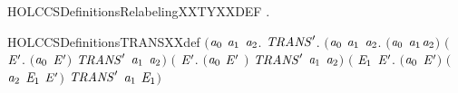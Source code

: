 \newcommand{\HOLCCSDefinitionsRelabelingXXISOXXDEF}{\UseVerbatim{HOLCCSDefinitionsRelabelingXXISOXXDEF}}
\begin{SaveVerbatim}{HOLCCSDefinitionsRelabelingXXTYXXDEF}
\HOLTokenTurnstile{} \HOLSymConst{\HOLTokenExists{}}.   
\end{SaveVerbatim}
\newcommand{\HOLCCSDefinitionsRelabelingXXTYXXDEF}{\UseVerbatim{HOLCCSDefinitionsRelabelingXXTYXXDEF}}
\begin{SaveVerbatim}{HOLCCSDefinitionsTRANSXXdef}
\HOLTokenTurnstile{}  \HOLSymConst{\ensuremath{=}}
   \ensuremath{(}\HOLTokenLambda{}\ensuremath{\HOLBoundVar{a}\sb{\mathrm{0}}} \ensuremath{\HOLBoundVar{a}\sb{\mathrm{1}}} \ensuremath{\HOLBoundVar{a}\sb{\mathrm{2}}}.
        \HOLSymConst{\HOLTokenForall{}}\ensuremath{\HOLBoundVar{TRANS}\sp{\prime{}}}.
          \ensuremath{(}\HOLSymConst{\HOLTokenForall{}}\ensuremath{\HOLBoundVar{a}\sb{\mathrm{0}}} \ensuremath{\HOLBoundVar{a}\sb{\mathrm{1}}} \ensuremath{\HOLBoundVar{a}\sb{\mathrm{2}}}.
             \ensuremath{(}\ensuremath{\HOLBoundVar{a}\sb{\mathrm{0}}} \HOLSymConst{\ensuremath{=}} \ensuremath{\HOLBoundVar{a}\sb{\mathrm{1}}}\HOLSymConst{\ensuremath{\ldotp}}\ensuremath{\HOLBoundVar{a}\sb{\mathrm{2}}}\ensuremath{)} \HOLSymConst{\HOLTokenDisj{}}
             \ensuremath{(}\HOLSymConst{\HOLTokenExists{}} \ensuremath{\HOLBoundVar{E}\sp{\prime{}}}. \ensuremath{(}\ensuremath{\HOLBoundVar{a}\sb{\mathrm{0}}} \HOLSymConst{\ensuremath{=}}  \HOLSymConst{\ensuremath{+}} \ensuremath{\HOLBoundVar{E}\sp{\prime{}}}\ensuremath{)} \HOLSymConst{\HOLTokenConj{}} \ensuremath{\HOLBoundVar{TRANS}\sp{\prime{}}}  \ensuremath{\HOLBoundVar{a}\sb{\mathrm{1}}} \ensuremath{\HOLBoundVar{a}\sb{\mathrm{2}}}\ensuremath{)} \HOLSymConst{\HOLTokenDisj{}}
             \ensuremath{(}\HOLSymConst{\HOLTokenExists{}} \ensuremath{\HOLBoundVar{E}\sp{\prime{}}}. \ensuremath{(}\ensuremath{\HOLBoundVar{a}\sb{\mathrm{0}}} \HOLSymConst{\ensuremath{=}} \ensuremath{\HOLBoundVar{E}\sp{\prime{}}} \HOLSymConst{\ensuremath{+}} \ensuremath{)} \HOLSymConst{\HOLTokenConj{}} \ensuremath{\HOLBoundVar{TRANS}\sp{\prime{}}}  \ensuremath{\HOLBoundVar{a}\sb{\mathrm{1}}} \ensuremath{\HOLBoundVar{a}\sb{\mathrm{2}}}\ensuremath{)} \HOLSymConst{\HOLTokenDisj{}}
             \ensuremath{(}\HOLSymConst{\HOLTokenExists{}} \ensuremath{\HOLBoundVar{E}\sb{\mathrm{1}}} \ensuremath{\HOLBoundVar{E}\sp{\prime{}}}.
                \ensuremath{(}\ensuremath{\HOLBoundVar{a}\sb{\mathrm{0}}} \HOLSymConst{\ensuremath{=}}  \HOLSymConst{\ensuremath{\mid}} \ensuremath{\HOLBoundVar{E}\sp{\prime{}}}\ensuremath{)} \HOLSymConst{\HOLTokenConj{}} \ensuremath{(}\ensuremath{\HOLBoundVar{a}\sb{\mathrm{2}}} \HOLSymConst{\ensuremath{=}} \ensuremath{\HOLBoundVar{E}\sb{\mathrm{1}}} \HOLSymConst{\ensuremath{\mid}} \ensuremath{\HOLBoundVar{E}\sp{\prime{}}}\ensuremath{)} \HOLSymConst{\HOLTokenConj{}} \ensuremath{\HOLBoundVar{TRANS}\sp{\prime{}}}  \ensuremath{\HOLBoundVar{a}\sb{\mathrm{1}}} \ensuremath{\HOLBoundVar{E}\sb{\mathrm{1}}}\ensuremath{)} \HOLSymConst{\HOLTokenDisj{}}

\end{SaveVerbatim}
